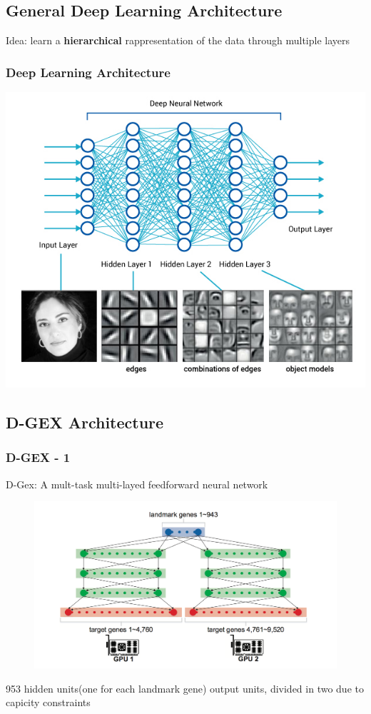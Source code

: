 \documentclass[professionalfont]{beamer}
\begin{document}
  \subsection{General Deep Learning Architecture}
	\begin{frame}
	  Idea: learn a \textbf{hierarchical} rappresentation of the data through multiple layers
	  \frametitle{Deep Learning Architecture}
	  \begin{center}
	    \includegraphics[scale=0.35]{figures/deep_learning_net.jpg}
	  \end{center}
	\end{frame}

  \subsection{D-GEX Architecture}
  \begin{frame}
    \frametitle{D-GEX - 1}
    D-Gex: A mult-task multi-layed feedforward neural network
    \begin{figure}
      \centering
      \includegraphics[scale=0.35]{figures/dgexarch.png}
    \end{figure}
    953 hidden units(one for each landmark gene) output units, divided in two due to capicity constraints
  \end{frame}
\end{document}
